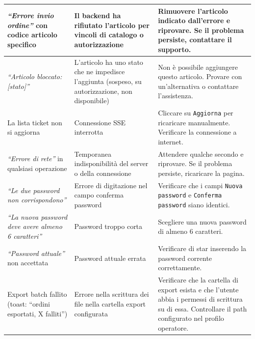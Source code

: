 \begin{longtable}{|p{4cm}|p{4cm}|p{5.5cm}|}
    \hline
    \textit{``Errore invio ordine''} con codice articolo specifico & Il backend ha rifiutato l'articolo per vincoli di catalogo o autorizzazione & Rimuovere l'articolo indicato dall'errore e riprovare. Se il problema persiste, contattare il supporto. \\
    \hline
    \textit{``Articolo bloccato: [stato]''} & L'articolo ha uno stato che ne impedisce l'aggiunta (sospeso, su autorizzazione, non disponibile) & Non \`e possibile aggiungere questo articolo. Provare con un'alternativa o contattare l'assistenza. \\
    \hline
    La lista ticket non si aggiorna & Connessione SSE interrotta & Cliccare su \texttt{Aggiorna} per ricaricare manualmente. Verificare la connessione a internet. \\
    \hline
    \textit{``Errore di rete''} in qualsiasi operazione & Temporanea indisponibilit\`a del server o della connessione & Attendere qualche secondo e riprovare. Se il problema persiste, ricaricare la pagina. \\
    \hline
    \textit{``Le due password non corrispondono''} & Errore di digitazione nel campo conferma password & Verificare che i campi \texttt{Nuova password} e \texttt{Conferma password} siano identici. \\
    \hline
    \textit{``La nuova password deve avere almeno 6 caratteri''} & Password troppo corta & Scegliere una nuova password di almeno 6 caratteri. \\
    \hline
    \textit{``Password attuale''} non accettata & Password attuale errata & Verificare di star inserendo la password corrente correttamente. \\
    \hline
    Export batch fallito (toast: ``ordini esportati, X falliti'') & Errore nella scrittura dei file nella cartella export configurata & Verificare che la cartella di export esista e che l'utente abbia i permessi di scrittura su di essa. Controllare il path configurato nel profilo operatore. \\
    \hline
    \end{longtable}
